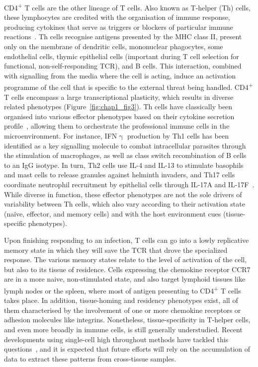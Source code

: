 CD4\textsuperscript{+} T cells are the other lineage of T cells. Also known as T-helper (Th) cells, these lymphocytes are credited with the organisation of immune response, producing cytokines that serve as triggers or blockers of particular immune reactions~\citep{luckheeram_cd4+t_2012}. Th cells recognise antigens presented by the MHC class II, present only on the membrane of dendritic cells, mononuclear phagocytes, some endothelial cells, thymic epithelial cells (important during T cell selection for functional, non-self-responding TCR), and B cells. This interaction, combined with signalling from the media where the cell is acting, induce an activation programme of the cell that is specific to the external threat being handled. CD4\textsuperscript{+} T cells encompass a large transcriptional plasticity, which results in diverse related phenotypes (Figure~\ref{fig:chap1_fig3}). Th cells have classically been organised into various effector phenotypes based on their cytokine secretion profile~\citep{mosmann_two_1986,schmitt_regulation_2015}, allowing them to orchestrate the professional immune cells in the microenvironment. For instance, IFN${\upgamma}$ production by Th1 cells has been identified as a key signalling molecule to combat intracellular parasites through the stimulation of macrophages, as well as class switch recombination of B cells to an IgG isotype. In turn, Th2 cells use IL-4 and IL-13 to stimulate basophils and mast cells to release granules against helminth invaders, and Th17 cells coordinate neutrophil recruitment by epithelial cells through IL-17A and IL-17F~\citep{weaver_th17_2013}. While diverse in function, these effector phenotypes are not the sole drivers of variability between Th cells, which also vary according to their activation state (naïve, effector, and memory cells) and with the host environment cues (tissue-specific phenotypes). 

Upon finishing responding to an infection, T cells can go into a lowly replicative memory state in which they will save the TCR that drove the specialized response. The various memory states relate to the level of activation of the cell, but also to its tissue of residence. Cells expressing the chemokine receptor CCR7 are in a more naive, non-stimulated state, and also target lymphoid tissues like lymph nodes or the spleen, where most of antigen presenting to CD4\textsuperscript{+} T cells takes place. In addition, tissue-homing and residency phenotypes exist, all of them characterised by the involvement of one or more chemokine receptors or adhesion molecules like integrins. Nonetheless, tissue-specificity in T-helper cells, and even more broadly in immune cells, is still generally understudied. Recent developments using single-cell high throughout methods have tackled this questions~\citep{wong_high-dimensional_2016,scott_transcription_2018}, and it is expected that future efforts will rely on the accumulation of data to extract these patterns from cross-tissue samples.

